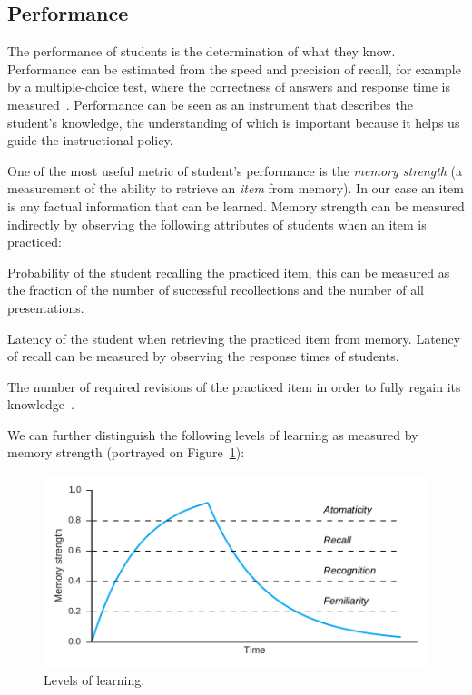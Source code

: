 \subsection{Performance}

The performance of students is the determination of what they know. Performance can be estimated from the speed and precision of recall, for example by a multiple-choice test, where the correctness of answers and response time is measured~\cite{Lewis}. Performance can be seen as an instrument that describes the student's knowledge, the understanding of which is important because it helps us guide the instructional policy.

One of the most useful metric of student's performance is the \textit{memory strength} (a measurement of the ability to retrieve an \textit{item} from memory). In our case an item is any factual information that can be learned. Memory strength can be measured indirectly by observing the following attributes of students when an item is practiced:

\begin{description}[leftmargin=0cm]
  \item[Probability of recall] Probability of the student recalling the practiced item, this can be measured as the fraction of the number of successful recollections and the number of all presentations.
  \item[Latency of recall] Latency of the student when retrieving the practiced item from memory. Latency of recall can be measured by observing the response times of students.
  \item[Savings in relearning] The number of required revisions of the practiced item in order to fully regain its knowledge~\cite{MichaelW.Eysenck2008}.
\end{description}

We can further distinguish the following levels of learning as measured by memory strength (portrayed on Figure~\ref{fig:knowledge-levels}):

\begin{figure}[htbp]
  \centering
  \includegraphics[width=\textwidth]{img/knowledge-levels}
  \caption{Levels of learning.}
  \label{fig:knowledge-levels}
\end{figure}

